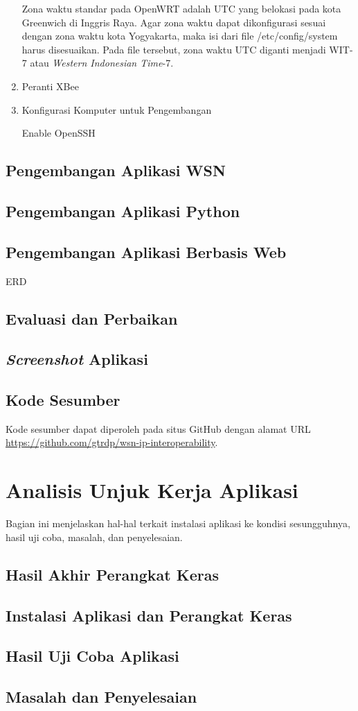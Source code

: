 \begin{enumerate}
					Zona waktu standar pada OpenWRT adalah UTC yang belokasi pada kota Greenwich di Inggris Raya. Agar zona waktu dapat dikonfigurasi sesuai dengan zona waktu kota Yogyakarta, maka isi dari file /etc/config/system harus disesuaikan. Pada file tersebut, zona waktu UTC diganti menjadi WIT-7 atau \emph{Western Indonesian Time}-7.

				\item Peranti XBee
					

				\item Konfigurasi Komputer untuk Pengembangan

				Enable OpenSSH
			\end{enumerate}
		\subsection{Pengembangan Aplikasi WSN}
		\subsection{Pengembangan Aplikasi Python}
		\subsection{Pengembangan Aplikasi Berbasis Web}

			ERD
		\subsection{Evaluasi dan Perbaikan}
		\subsection{\emph{Screenshot} Aplikasi}
		\subsection{Kode Sesumber}
			Kode sesumber dapat diperoleh pada situs GitHub dengan alamat URL \url{https://github.com/gtrdp/wsn-ip-interoperability}.


	\section{Analisis Unjuk Kerja Aplikasi}
		Bagian ini menjelaskan hal-hal terkait instalasi aplikasi ke kondisi sesungguhnya, hasil uji coba, masalah, dan penyelesaian.

		\subsection{Hasil Akhir Perangkat Keras}
		\subsection{Instalasi Aplikasi dan Perangkat Keras}
		\subsection{Hasil Uji Coba Aplikasi}
		\subsection{Masalah dan Penyelesaian}
